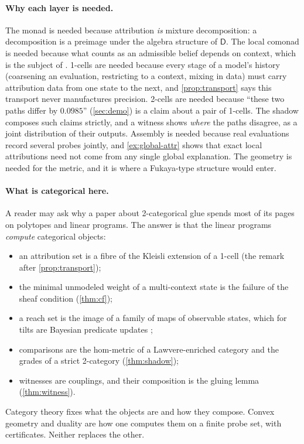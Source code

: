 \documentclass[11pt]{article}
\theoremstyle{definition}
\theoremstyle{remark}
\newcommand{\D}{\mathsf{D}}
\begin{document}
\paragraph{Why each layer is needed.} The monad is needed because attribution \emph{is} mixture
decomposition: a decomposition is a preimage under the algebra structure of $\D$. The local comonad
is needed because what counts as an admissible belief depends on context, which is the subject of
\cite{Awasthi-Tower}. 1-cells are needed because every stage of a model's history (coarsening an
evaluation, restricting to a context, mixing in data) must carry attribution data from one state to
the next, and \cref{prop:transport} says this transport never manufactures precision. 2-cells are
needed because ``these two paths differ by $0.0985$'' (\cref{sec:demo}) is a claim about a pair of
1-cells. The shadow composes such claims strictly, and a witness shows \emph{where} the paths
disagree, as a joint distribution of their outputs. Assembly is needed because real evaluations
record several probes jointly, and \cref{ex:global-attr} shows that exact local attributions need not
come from any single global explanation. The geometry is needed for the metric, and it is where a
Fukaya-type structure would enter.

\paragraph{What is categorical here.} A reader may ask why a paper about 2-categorical glue spends
most of its pages on polytopes and linear programs. The answer is that the linear programs
\emph{compute} categorical objects:
\begin{itemize}[leftmargin=*]
\item an attribution set is a fibre of the Kleisli extension of a 1-cell (the remark after
  \cref{prop:transport});
\item the minimal unmodeled weight of a multi-context state is the failure of the sheaf condition
  (\cref{thm:cf});
\item a reach set is the image of a family of maps of observable states, which for tilts are
  Bayesian predicate updates \cite{JacobsZanasi2016};
\item comparisons are the hom-metric of a Lawvere-enriched category and the grades of a strict
  2-category (\cref{thm:shadow});
\item witnesses are couplings, and their composition is the gluing lemma (\cref{thm:witness}).
\end{itemize}
Category theory fixes what the objects are and how they compose. Convex geometry and duality are how
one computes them on a finite probe set, with certificates. Neither replaces the other.
\end{document}
